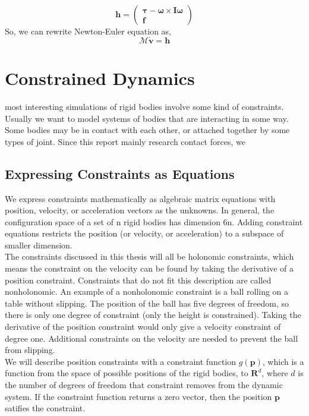     \begin{equation}
        \mathbf{h} = \left( \begin{array}{c} \pmb{\tau} - \pmb{\omega} \times \pmb{I} \pmb{\omega}\\ \pmb{f} \end{array}\right)
    \end{equation}
    So, we can rewrite Newton-Euler equation as,
    \begin{equation}
        \mathcal{M}\dot{\mathbf{v}} = \mathbf{h}
    \end{equation}


\section{Constrained Dynamics}
    most interesting simulations of rigid bodies involve some kind of constraints. Usually we want to model systems of bodies that are interacting in some way. Some bodies may be in contact with each other, or attached together by some types of joint. Since this report mainly research contact forces, we 
    \subsection{Expressing Constraints as Equations}
        We express constraints mathematically as algebraic matrix equations with position, velocity, or acceleration vectors as the unknowns. In general, the configuration space of a set of n rigid bodies has dimension 6n. Adding constraint equations restricts the position (or velocity, or acceleration) to a subspace of smaller dimension.\\

        The constraints discussed in this thesis will all be holonomic constraints, which means the constraint on the velocity can be found by taking the derivative of a position constraint. Constraints that do not fit this description are called nonholonomic. An example of a nonholonomic constraint is a ball rolling on a table without slipping. The position of the ball has five degrees of freedom, so there is only one degree of constraint (only the height is constrained). Taking the derivative of the position constraint would only give a velocity constraint of degree one. Additional constraints on the velocity are needed to prevent the ball from slipping.\\

        We will describe position constraints with a constraint function $g(\pmb{p})$, which is a function from the space of possible positions of the rigid bodies, to $\mathbf{R}^d$, where $d$ is the number of degrees of freedom that constraint removes from the dynamic system. If the constraint function returns a zero vector, then the position $\pmb{p}$ satifies the constraint. \\

